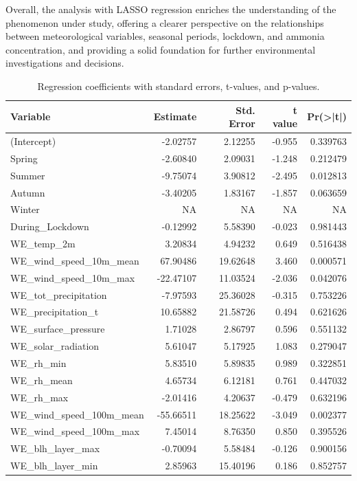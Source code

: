 \documentclass[10pt]{article} %
\begin{document}
    Overall, the analysis with LASSO regression enriches the understanding of the phenomenon under study, offering a clearer perspective on the relationships between meteorological variables, seasonal periods, lockdown, and ammonia concentration, and providing a solid foundation for further environmental investigations and decisions.
    \begin{table}[htbp]
    \centering
    \begin{tabular}{lrrrr}
    \textbf{Variable} & \textbf{Estimate} & \textbf{Std. Error} & \textbf{t value} & \textbf{Pr(\textgreater|t|)} \\ \hline
    (Intercept) & -2.02757 & 2.12255 & -0.955 & 0.339763 \\
    Spring & -2.60840 & 2.09031 & -1.248 & 0.212479 \\
    Summer & -9.75074 & 3.90812 & -2.495 & 0.012813 \\
    Autumn & -3.40205 & 1.83167 & -1.857 & 0.063659 \\
    Winter & NA & NA & NA & NA \\
    During\_Lockdown & -0.12992 & 5.58390 & -0.023 & 0.981443 \\
    WE\_temp\_2m & 3.20834 & 4.94232 & 0.649 & 0.516438 \\
    WE\_wind\_speed\_10m\_mean & 67.90486 & 19.62648 & 3.460 & 0.000571 \\
    WE\_wind\_speed\_10m\_max & -22.47107 & 11.03524 & -2.036 & 0.042076 \\
    WE\_tot\_precipitation & -7.97593 & 25.36028 & -0.315 & 0.753226 \\
    WE\_precipitation\_t & 10.65882 & 21.58726 & 0.494 & 0.621626 \\
    WE\_surface\_pressure & 1.71028 & 2.86797 & 0.596 & 0.551132 \\
    WE\_solar\_radiation & 5.61047 & 5.17925 & 1.083 & 0.279047 \\
    WE\_rh\_min & 5.83510 & 5.89835 & 0.989 & 0.322851 \\
    WE\_rh\_mean & 4.65734 & 6.12181 & 0.761 & 0.447032 \\
    WE\_rh\_max & -2.01416 & 4.20637 & -0.479 & 0.632196 \\
    WE\_wind\_speed\_100m\_mean & -55.66511 & 18.25622 & -3.049 & 0.002377 \\
    WE\_wind\_speed\_100m\_max & 7.45014 & 8.76350 & 0.850 & 0.395526 \\
    WE\_blh\_layer\_max & -0.70094 & 5.58484 & -0.126 & 0.900156 \\
    WE\_blh\_layer\_min & 2.85963 & 15.40196 & 0.186 & 0.852757 \\ \hline
    \end{tabular}
    \caption{Regression coefficients with standard errors, t-values, and p-values.}
    \label{tab:regression}
    \end{table}
\end{document}
